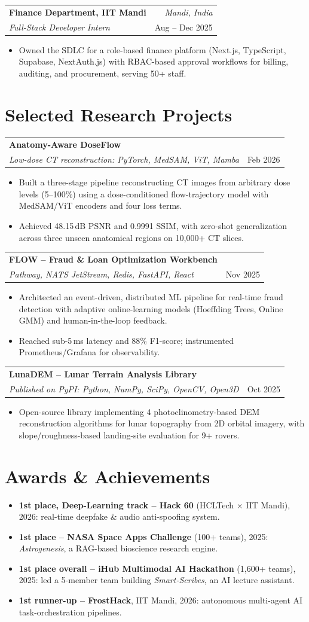 \documentclass[a4paper,10pt]{article}
\makeatletter
\newcommand{\resumeItem}[1]{\item\small #1}
\newcommand{\tightlist}{\begin{itemize}[leftmargin=1.05em,itemsep=0pt,topsep=1pt,parsep=0pt,partopsep=0pt]}
\newcommand{\tightlistend}{\end{itemize}}
\newcommand{\entry}[4]{%
  \begin{tabularx}{\linewidth}{@{}X@{\hspace{4pt}}r@{}}
    \textbf{#1} & {\small\itshape\color{gray}#3}\\
    \textit{\small #2} & {\small\color{gray}#4}
  \end{tabularx}\vspace{2pt}
}
\makeatother
\begin{document}
\entry{Finance Department, IIT Mandi}{Full-Stack Developer Intern}{Mandi, India}{Aug -- Dec 2025}
\vspace{-4pt}
\tightlist
\resumeItem{Owned the SDLC for a role-based finance platform (Next.js, TypeScript, Supabase, NextAuth.js) with RBAC-based approval workflows for billing, auditing, and procurement, serving 50+ staff.}
\tightlistend

\section{Selected Research Projects}
\entry{Anatomy-Aware DoseFlow}{Low-dose CT reconstruction: PyTorch, MedSAM, ViT, Mamba}{}{Feb 2026}
\vspace{-4pt}
\tightlist
\resumeItem{Built a three-stage pipeline reconstructing CT images from arbitrary dose levels (5--100\%) using a dose-conditioned flow-trajectory model with MedSAM/ViT encoders and four loss terms.}
\resumeItem{Achieved 48.15\,dB PSNR and 0.9991 SSIM, with zero-shot generalization across three unseen anatomical regions on 10,000+ CT slices.}
\tightlistend

\entry{FLOW -- Fraud \& Loan Optimization Workbench}{Pathway, NATS JetStream, Redis, FastAPI, React}{}{Nov 2025}
\vspace{-4pt}
\tightlist
\resumeItem{Architected an event-driven, distributed ML pipeline for real-time fraud detection with adaptive online-learning models (Hoeffding Trees, Online GMM) and human-in-the-loop feedback.}
\resumeItem{Reached sub-5\,ms latency and 88\% F1-score; instrumented Prometheus/Grafana for observability.}
\tightlistend

\entry{LunaDEM -- Lunar Terrain Analysis Library}{Published on PyPI: Python, NumPy, SciPy, OpenCV, Open3D}{}{Oct 2025}
\vspace{-4pt}
\tightlist
\resumeItem{Open-source library implementing 4 photoclinometry-based DEM reconstruction algorithms for lunar topography from 2D orbital imagery, with slope/roughness-based landing-site evaluation for 9+ rovers.}
\tightlistend

\section{Awards \& Achievements}
\tightlist
\resumeItem{\textbf{1st place, Deep-Learning track -- Hack 60} (HCLTech $\times$ IIT Mandi), 2026: real-time deepfake \& audio anti-spoofing system.}
\resumeItem{\textbf{1st place -- NASA Space Apps Challenge} (100+ teams), 2025: \textit{Astrogenesis}, a RAG-based bioscience research engine.}
\resumeItem{\textbf{1st place overall -- iHub Multimodal AI Hackathon} (1,600+ teams), 2025: led a 5-member team building \textit{Smart-Scribes}, an AI lecture assistant.}
\resumeItem{\textbf{1st runner-up -- FrostHack}, IIT Mandi, 2026: autonomous multi-agent AI task-orchestration pipelines.}
\tightlistend
\end{document}
